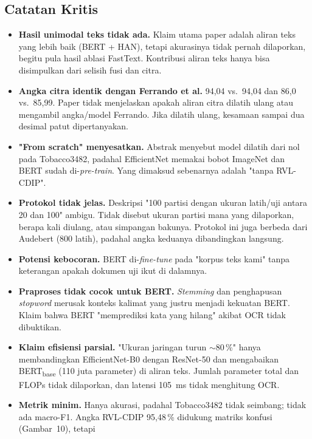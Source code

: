 \subsection{Catatan Kritis}
\begin{itemize}
  \item \textbf{Hasil unimodal teks tidak ada.} Klaim utama paper adalah aliran teks yang
        lebih baik (BERT + HAN), tetapi akurasinya tidak pernah dilaporkan, begitu pula
        hasil ablasi FastText. Kontribusi aliran teks hanya bisa disimpulkan dari selisih
        fusi dan citra.
  \item \textbf{Angka citra identik dengan Ferrando et al.} 94,04 vs.\ 94,04 dan 86,0 vs.\
        85,99. Paper tidak menjelaskan apakah aliran citra dilatih ulang atau mengambil
        angka/model Ferrando. Jika dilatih ulang, kesamaan sampai dua desimal patut
        dipertanyakan.
  \item \textbf{"From scratch" menyesatkan.} Abstrak menyebut model dilatih dari nol pada
        Tobacco3482, padahal EfficientNet memakai bobot ImageNet dan BERT sudah
        di-\emph{pre-train}. Yang dimaksud sebenarnya adalah "tanpa RVL-CDIP".
  \item \textbf{Protokol tidak jelas.} Deskripsi "100 partisi dengan ukuran latih/uji
        antara 20 dan 100" ambigu. Tidak disebut ukuran partisi mana yang dilaporkan,
        berapa kali diulang, atau simpangan bakunya. Protokol ini juga berbeda dari
        Audebert (800 latih), padahal angka keduanya dibandingkan langsung.
  \item \textbf{Potensi kebocoran.} BERT di-\emph{fine-tune} pada "korpus teks kami" tanpa
        keterangan apakah dokumen uji ikut di dalamnya.
  \item \textbf{Praproses tidak cocok untuk BERT.} \emph{Stemming} dan penghapusan
        \emph{stopword} merusak konteks kalimat yang justru menjadi kekuatan BERT. Klaim
        bahwa BERT "memprediksi kata yang hilang" akibat OCR tidak dibuktikan.
  \item \textbf{Klaim efisiensi parsial.} "Ukuran jaringan turun $\sim$80\,\%" hanya
        membandingkan EfficientNet-B0 dengan ResNet-50 dan mengabaikan BERT\textsubscript{base}
        (110 juta parameter) di aliran teks. Jumlah parameter total dan FLOPs tidak
        dilaporkan, dan latensi 105~ms tidak menghitung OCR.
  \item \textbf{Metrik minim.} Hanya akurasi, padahal Tobacco3482 tidak seimbang; tidak ada
        macro-F1. Angka RVL-CDIP 95,48\,\% didukung matriks konfusi (Gambar~10), tetapi

\end{itemize}
